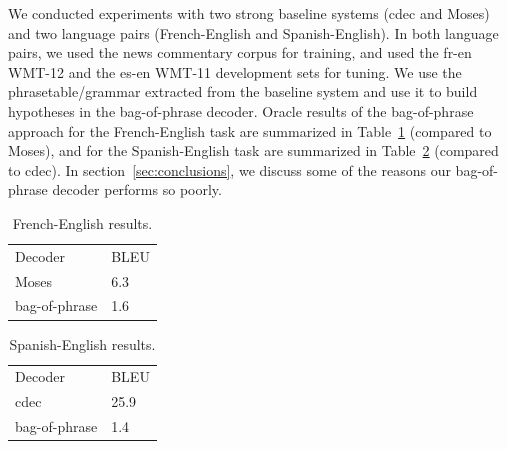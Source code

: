 \documentclass[11pt]{article}
\numberwithin{equation}{section}
\begin{document}
We conducted experiments with two strong baseline systems (cdec and Moses) and two language pairs (French-English and Spanish-English). In both language pairs, we used the news commentary corpus for training, and used the fr-en WMT-12 and the es-en WMT-11 development sets for tuning. We use the phrasetable/grammar extracted from the baseline system and use it to build hypotheses in the bag-of-phrase decoder. Oracle results of the bag-of-phrase approach for the French-English task are summarized in Table~\ref{fren} (compared to Moses), and for the Spanish-English task are summarized in Table~\ref{esen} (compared to cdec). In section~\ref{sec:conclusions}, we discuss some of the reasons our bag-of-phrase decoder performs so poorly.

\begin{table}
    \begin{tabular}{ll}
    Decoder       & BLEU \\
    Moses         & 6.3  \\
    bag-of-phrase & 1.6  \\
    \end{tabular}
\caption{\label{fren}French-English results.}
\end{table}

\begin{table}
    \begin{tabular}{ll}
    Decoder       & BLEU \\
    cdec         & 25.9  \\
    bag-of-phrase & 1.4  \\
    \end{tabular}
\caption{\label{esen}Spanish-English results.}
\end{table}
\end{document}

